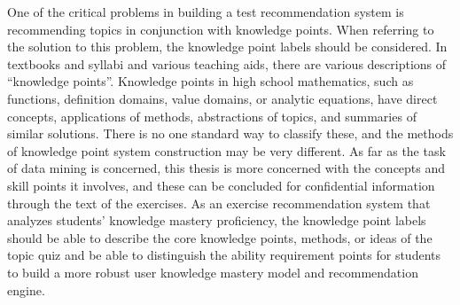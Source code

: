 One of the critical problems in building a test recommendation system is recommending topics in conjunction with knowledge points. When referring to the solution to this problem, the knowledge point labels should be considered. In textbooks and syllabi and various teaching aids, there are various descriptions of ``knowledge points''. Knowledge points in high school mathematics, such as functions, definition domains, value domains, or analytic equations, have direct concepts, applications of methods, abstractions of topics, and summaries of similar solutions. There is no one standard way to classify these, and the methods of knowledge point system construction may be very different. As far as the task of data mining is concerned, this thesis is more concerned with the concepts and skill points it involves, and these can be concluded for confidential information through the text of the exercises. As an exercise recommendation system that analyzes students' knowledge mastery proficiency, the knowledge point labels should be able to describe the core knowledge points, methods, or ideas of the topic quiz and be able to distinguish the ability requirement points for students to build a more robust user knowledge mastery model and recommendation engine.

